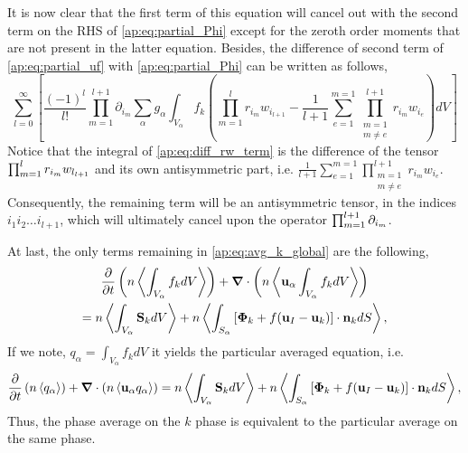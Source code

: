 It is now clear that the first term of this equation will cancel out with the second term on the RHS of \ref{ap:eq:partial_Phi} except for the zeroth order moments that are not present in the latter equation.
Besides, the difference of second term of \ref{ap:eq:partial_uf} with \ref{ap:eq:partial_Phi} can be written as follows, 
\begin{equation}    
    \sum_{l=0}^\infty  
    \left[
        \frac{(-1)^l}{l!} \prod^{l+1}_{m=1}\partial_{i_m}
        \sum_\alpha  g_\alpha 
        \int_{V_\alpha} f_k\left(
            \prod^l_{m=1}r_{i_m} w_{i_{l+1}} 
            -
            \frac{1}{l+1}
            \sum_{e=1}^{m=1} 
            \prod^{l+1}_{\substack{m=1\\ m\neq e}} 
            r_{i_m} 
            w_{i_e}
        \right)
        dV
    \right]
    \label{ap:eq:diff_rw_term}
\end{equation}
Notice that the integral of \ref{ap:eq:diff_rw_term} is the difference of the tensor $\prod_{m=1}^{l} r_{i_m}w_{l_{l+1}}$ and its own antisymmetric part, i.e. $\frac{1}{l+1} \sum_{e=1}^{m=1} \prod^{l+1}_{\substack{m=1\\ m\neq e}} r_{i_m} w_{i_e}$.
Consequently, the remaining term will be an antisymmetric tensor, in the indices $i_1i_2\ldots i_{l+1}$, which will ultimately cancel upon the operator $\prod_{m=1}^{l+1} \partial_{i_m}$.

At last, the only terms remaining in \ref{ap:eq:avg_k_global} are the following,
\begin{multline*}
    \frac{\partial}{\partial t}   \left(n \left<\int_{V_\alpha} f_k dV\right>\right)
    + \bm{\nabla} \cdot \left(n \left<\textbf{u}_\alpha \int_{V_\alpha} f_k  dV  \right>\right)\\
    = n \left<\int_{V_\alpha} \textbf{S}_k dV \right>
    + n \left<\int_{S_\alpha} \left[\bm{\Phi}_k 
    + f (\textbf{u}_I-\textbf{u}_k) \right] \cdot \textbf{n}_k d S\right>,
\end{multline*}
If we note, $q_\alpha = \int_{V_\alpha} f_k dV$ it yields the particular averaged equation, i.e. 
\begin{equation}
    \frac{\partial}{\partial t}   \left(n \left<q_\alpha\right>\right)
    + \bm{\nabla} \cdot \left(n \left<\textbf{u}_\alpha q_\alpha  \right>\right)
    = n \left<\int_{V_\alpha} \textbf{S}_k dV \right>
    + n \left<\int_{S_\alpha} \left[\bm{\Phi}_k 
    + f (\textbf{u}_I-\textbf{u}_k) \right] \cdot \textbf{n}_k d S\right>,
\end{equation}
Thus, the phase average on the $k$ phase is equivalent to the particular average on the same phase. 




